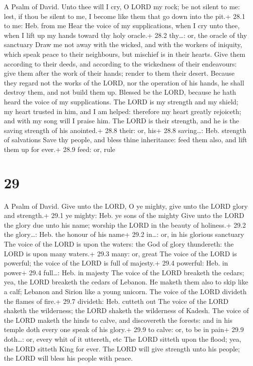 A Psalm of David.  Unto thee will I cry, O LORD my rock; be
not silent to me: lest, if thou be silent to me, I become like them that
go down into the pit.+ 28.1 to me: Heb. from me  Hear the
voice of my supplications, when I cry unto thee, when I lift up my hands
toward thy holy oracle.+ 28.2 thy\ldots: or, the oracle of thy sanctuary
 Draw me not away with the wicked, and with the workers of
iniquity, which speak peace to their neighbours, but mischief is in
their hearts.  Give them according to their deeds, and
according to the wickedness of their endeavours: give them after the
work of their hands; render to them their desert.  Because
they regard not the works of the LORD, nor the operation of his hands,
he shall destroy them, and not build them up.  Blessed be
the LORD, because he hath heard the voice of my supplications.
 The LORD is my strength and my shield; my heart trusted in
him, and I am helped: therefore my heart greatly rejoiceth; and with my
song will I praise him.  The LORD is their strength, and he
is the saving strength of his anointed.+ 28.8 their: or, his+ 28.8
saving\ldots: Heb. strength of salvations  Save thy people,
and bless thine inheritance: feed them also, and lift them up for ever.+
28.9 feed: or, rule

\hypertarget{section-28}{%
\section{29}\label{section-28}}

A Psalm of David.  Give unto the LORD, O ye mighty, give
unto the LORD glory and strength.+ 29.1 ye mighty: Heb. ye sons of the
mighty  Give unto the LORD the glory due unto his name;
worship the LORD in the beauty of holiness.+ 29.2 the glory\ldots: Heb.
the honour of his name+ 29.2 in\ldots: or, in his glorious sanctuary
 The voice of the LORD is upon the waters: the God of glory
thundereth: the LORD is upon many waters.+ 29.3 many: or, great
 The voice of the LORD is powerful; the voice of the LORD is
full of majesty.+ 29.4 powerful: Heb. in power+ 29.4 full\ldots: Heb. in
majesty  The voice of the LORD breaketh the cedars; yea, the
LORD breaketh the cedars of Lebanon.  He maketh them also to
skip like a calf; Lebanon and Sirion like a young unicorn. 
The voice of the LORD divideth the flames of fire.+ 29.7 divideth: Heb.
cutteth out  The voice of the LORD shaketh the wilderness;
the LORD shaketh the wilderness of Kadesh.  The voice of the
LORD maketh the hinds to calve, and discovereth the forests: and in his
temple doth every one speak of his glory.+ 29.9 to calve: or, to be in
pain+ 29.9 doth\ldots: or, every whit of it uttereth, etc 
The LORD sitteth upon the flood; yea, the LORD sitteth King for ever.
 The LORD will give strength unto his people; the LORD will
bless his people with peace.

